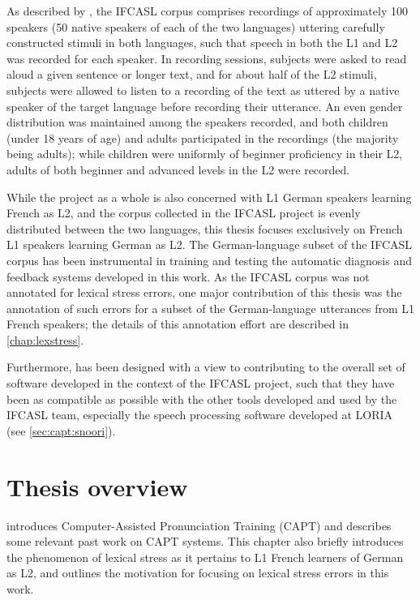As described by \textcite{Trouvain2013,Fauth2014}, the IFCASL corpus comprises recordings of approximately 100 speakers (50 native speakers of each of the two languages) uttering carefully constructed stimuli in both languages, such that speech in both the L1 and L2 was recorded for each speaker. In recording sessions, subjects were asked to read aloud a given sentence or longer text, and for about half of the L2 stimuli, subjects were allowed to listen to a recording of the text as uttered by a native speaker of the target language before recording their utterance. An even gender distribution was maintained among the speakers recorded, and both children (under 18 years of age) and adults participated in the recordings (the majority being adults); while children were uniformly of beginner proficiency in their L2, adults of both beginner and advanced levels in the L2 were recorded. 

While the project as a whole is also concerned with L1 German speakers learning French as L2, and the corpus collected in the IFCASL project is evenly distributed between the two languages, this thesis focuses exclusively on French L1 speakers learning German as L2. 
The German-language subset of the IFCASL corpus has been instrumental in training and testing the automatic diagnosis and feedback systems developed in this work. As the IFCASL corpus was not annotated for lexical stress errors, one major contribution of this thesis was the annotation of such errors for a subset of the German-language utterances from L1 French speakers; the details of this annotation effort are described in \cref{chap:lexstress}. 

Furthermore, 
 has been designed with a view to contributing to the overall set of software developed in the context of the IFCASL project, such that they have been as compatible as possible with the other tools developed and used by the IFCASL team, especially the  speech processing software developed at LORIA (see \cref{sec:capt:snoori}).




\section{Thesis overview}
\label{sec:intro:overview}


 introduces Computer-Assisted Pronunciation Training (CAPT) 
and describes some relevant past work on CAPT systems. 
This chapter also briefly 
introduces the phenomenon of lexical stress as it pertains to L1 French learners of German as L2, and outlines
the motivation for focusing on lexical stress errors in this work.


